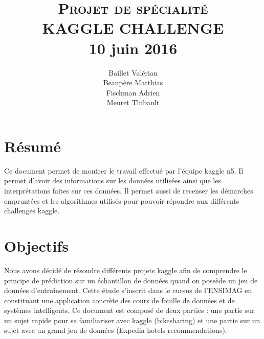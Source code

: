 \documentclass[12pt,a4paper]{article} %
\title{ \normalsize \textsc{Projet de spécialité} \\
	\vspace{15px}
	\LARGE \textbf{\uppercase{Kaggle challenge}} \\
	\vspace{15px}
	\normalsize 10 juin 2016 \vspace*{5\baselineskip}}
\author{Baillet Valérian\\Beaupère Matthias\\Fischman Adrien\\Meuret Thibault}
\date{} %
\begin{document}
\maketitle

\newpage
\tableofcontents

\newpage

\section{Résumé}
Ce document permet de montrer le travail effectué par l'équipe kaggle n5. Il permet d'avoir des informations sur les données utilisées ainsi que les interprétations faites sur ces données. Il permet aussi de recenser les démarches empruntées et les algorithmes utilisés pour pouvoir répondre aux différents challenges kaggle.

\section{Objectifs}
Nous avons décidé de résoudre différents projets kaggle afin de comprendre le principe de prédiction sur un échantillon de données quand on possède un jeu de données d’entraînement. Cette étude s'inscrit dans le cursus de l'ENSIMAG en constituant une application concrète des cours de fouille de données et de systèmes intelligents. Ce document est composé de deux parties : une partie sur un sujet rapide pour se familiariser avec kaggle (bikesharing) et une partie sur un sujet avec un grand jeu de données (Expedia hotels recommendations).



\end{document}
